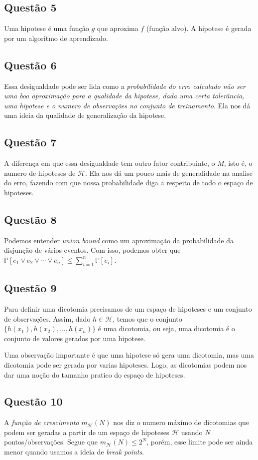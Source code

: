 \documentclass[12pt, a4paper]{article}
\begin{document}
\subsection*{Questão 5}{
    Uma hipotese é uma função $ g $ que aproxima $ f $ (função alvo). A hipotese é gerada por um algoritmo de aprendizado.
}

\subsection*{Questão 6} {
    Essa desigualdade pode ser lida como a \emph{probabilidade do erro calculado não ser uma boa aproximação para a qualidade da hipotese, dada uma certa tolerância, uma hipotese e o numero de observações no conjunto de treinamento}. Ela nos dá uma ideia da qualidade de generalização da hipotese.
}

\subsection*{Questão 7} {
    A diferença em que essa desigualdade tem outro fator contribuinte, o $ M $, isto é, o numero de hipoteses de $ \mathcal{H} $. Ela nos dá um pouco mais de generalidade na analise do erro, fazendo com que nossa probabilidade diga a respeito de todo o espaço de hipoteses.
}

\subsection*{Questão 8} {
    Podemos entender \emph{union bound} como um aproximação da probabilidade da disjunção de vários eventos. Com isso, podemos obter que $ \mathbb{P}[e_1 \vee e_2 \vee \cdots \vee e_n] \le \sum_{i=1}^{n}\mathbb{P}[e_i] $.
}

\subsection*{Questão 9} {
    Para definir uma dicotomia precisamos de um espaço de hipoteses e um conjunto de observações. Assim, dado $ h \in \mathcal{H} $, temos que o conjunto $ \{h(x_1), h(x_2),..., h(x_n)\} $ é uma dicotomia, ou seja, uma dicotomia é o conjunto de valores gerados por uma hipotese. 

    Uma observação importante é que uma hipotese só gera uma dicotomia, mas uma dicotomia pode ser gerada por varias hipoteses. Logo, as dicotomias podem nos dar uma noção do tamanho pratico do espaço de hipoteses.
}

\subsection*{Questão 10} {
    A \emph{função de crescimento} $ m_{\mathcal{H}}(N) $ nos diz o numero máximo de dicotomias que podem ser geradas a partir de um espaço de hipoteses $ \mathcal{H} $ usando $ N $ pontos/observações. Segue que $ m_{\mathcal{H}}(N) \le 2^{N} $, porém, esse limite pode ser ainda menor quando usamos a ideia de \emph{break points}.
}
\end{document}
